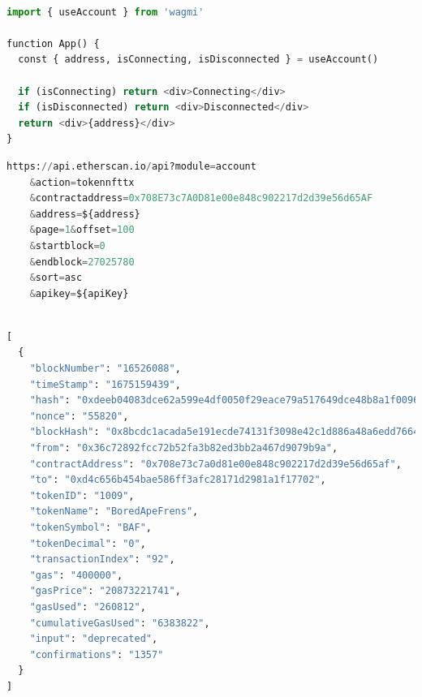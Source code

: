 \begin{center}
\begin{lstlisting}[label=lst:wagmi ,language=python, caption=An example of getting a wallet's public address using \textit{wagmi React Hooks for Ethereum} \cite{wagmi}. This can be used once the wallet has been connected successfully., captionpos=b]

import { useAccount } from 'wagmi'
 
function App() {
  const { address, isConnecting, isDisconnected } = useAccount()
 
  if (isConnecting) return <div>Connecting</div>
  if (isDisconnected) return <div>Disconnected</div>
  return <div>{address}</div>
}

\end{lstlisting}
\end{center}


\begin{center}
\begin{lstlisting}[label=lst:apiCall ,language=python, caption=A real-world example API call made from the frontend in order to retrieve all of a user's transactional data. The API is provided by \textit{Etherscan} \cite{etherscan}., captionpos=b]
https://api.etherscan.io/api?module=account
    &action=tokennfttx
    &contractaddress=0x708E73c7A0D81e00e848c902217d2d39e56d65AF
    &address=${address}
    &page=1&offset=100
    &startblock=0
    &endblock=27025780
    &sort=asc
	&apikey=${apiKey}
\end{lstlisting}
\end{center}


\begin{center}
\begin{lstlisting}[label=lst:apiResult ,language=python, caption={A real-world example of the response to the API request from listing \ref{lst:apiCall}. The result contains a variety of information, such as the transaction timestamp, the sender's public address (from), and the receivers public address (to). The response is provided by the \textit{Etherscan} API \cite{etherscan}.}, captionpos=b]

[
  {
    "blockNumber": "16526088",
    "timeStamp": "1675159439",
    "hash": "0xdeeb04083dce62a599e4df0050f29eace79a517649dce48b8a1f00961f39742c",
    "nonce": "55820",
    "blockHash": "0x8bcdc1acada5e191ecde74131f3098e42c1d886a48a6edd766425c725d976455",
    "from": "0x36c72892fcc72b52fa3b82ed3bb2a467d9079b9a",
    "contractAddress": "0x708e73c7a0d81e00e848c902217d2d39e56d65af",
    "to": "0xd4c656b454bae586ff3afc28171d2981a1f17702",
    "tokenID": "1009",
    "tokenName": "BoredApeFrens",
    "tokenSymbol": "BAF",
    "tokenDecimal": "0",
    "transactionIndex": "92",
    "gas": "400000",
    "gasPrice": "20873221741",
    "gasUsed": "260812",
    "cumulativeGasUsed": "6383822",
    "input": "deprecated",
    "confirmations": "1357"
  }
]

\end{lstlisting}
\end{center}